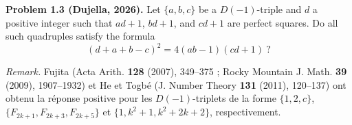 \textbf{Problem 1.3 (Dujella, 2026).} Let $\{a,b,c\}$ be a $D(-1)$-triple and $d$ a positive integer such that $ad+1$, $bd+1$, and $cd+1$ are perfect squares. Do all such quadruples satisfy the formula
\[
(d+a+b-c)^2 = 4(ab-1)(cd+1)\ ?
\]

\medskip

\textit{Remark.} Fujita (Acta Arith. \textbf{128} (2007), 349--375 ; Rocky Mountain J. Math. \textbf{39} (2009), 1907--1932) et He et Togbé (J. Number Theory \textbf{131} (2011), 120--137) ont obtenu la réponse positive pour les $D(-1)$-triplets de la forme $\{1,2,c\}$, $\{F_{2k+1}, F_{2k+3}, F_{2k+5}\}$ et $\{1, k^2+1, k^2+2k+2\}$, respectivement.
